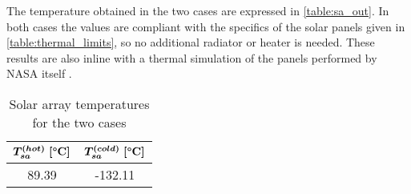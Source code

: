 The temperature obtained in the two cases are expressed in \autoref{table:sa_out}. 
In both cases the values are compliant with the specifics of the solar panels given in \autoref{table:thermal_limits}, so no additional radiator or heater is needed. These results are also inline with a thermal simulation of the panels performed by NASA itself \cite{solar_panels_coef}.

\begin{table}[H]
    \renewcommand{\arraystretch}{1.5}
    \centering
    \begin{tabular}{|c|c|}
        \hline
        $\boldsymbol{T_{sa}^{(hot)} \; [\textrm{\textbf{°C}}]}$ & $\boldsymbol{T_{sa}^{(cold)} \; [\textrm{\textbf{°C}}]}$ \\
        \hline
        89.39 & -132.11 \\
        \hline
    \end{tabular}
    \caption{Solar array temperatures for the two cases}
    \label{table:sa_out}
\end{table}

